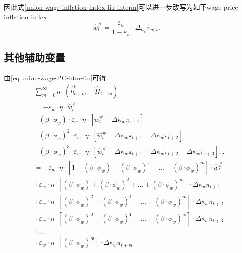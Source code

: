 因此式\eqref{union-wage-inflation-index-lin-interm}可以进一步改写为如下wage price inflation index
\begin{equation}
\label{union-wage-inflation-index-lin}
\hat{w}^{\#}_t = \frac{\varepsilon_w}{1-\varepsilon_w} \cdot \Delta_{\kappa_w} \hat{\pi}_{w,t}.
\end{equation}

\subsection{其他辅助变量}
\label{sec:union-wage-PC-wage-auxiliary-others}
由\eqref{eq:union-wage-PC-htm-lin}可得
\begin{equation*}
\begin{split}
&\sum_{m=0}^{\infty} \eta \cdot \left(\hat{h}_{t+m}^t - \hat{H}_{t+m}\right) \\
&=-\varepsilon_w \cdot \eta \cdot \hat{w}^{\#}_t \\
&-\left(\beta \cdot \phi_w \right) \cdot \varepsilon_w \cdot \eta \cdot \left[\hat{w}^{\#}_t - \Delta\kappa_w\pi_{t+1}\right] \\
&-\left(\beta \cdot \phi_w \right)^2 \cdot \varepsilon_w \cdot \eta \cdot \left[\hat{w}^{\#}_t - \Delta\kappa_w\pi_{t+1} - \Delta\kappa_w\pi_{t+2}\right] \\
&-\left(\beta \cdot \phi_w \right)^3 \cdot \varepsilon_w \cdot \eta \cdot \left[\hat{w}^{\#}_t - \Delta\kappa_w\pi_{t+1} - \Delta\kappa_w\pi_{t+2} - \Delta\kappa_w\pi_{t+3}\right] \ldots\\
&=-\varepsilon_w \cdot \eta \cdot \left[1 + \left(\beta \cdot \phi_w\right) + \left(\beta \cdot \phi_w\right)^2 + \ldots + \left(\beta \cdot \phi_w\right)^m\right] \cdot \hat{w}^{\#}_t \\
& +\varepsilon_w \cdot \eta \cdot \left[\left(\beta \cdot \phi_w\right) + \left(\beta \cdot \phi_w\right)^2 + \ldots + \left(\beta \cdot \phi_w\right)^m\right] \cdot \Delta\kappa_w\pi_{t+1} \\
& +\varepsilon_w \cdot \eta \cdot \left[\left(\beta \cdot \phi_w\right)^2 + \left(\beta \cdot \phi_w\right)^3 + \ldots + \left(\beta \cdot \phi_w\right)^m\right] \cdot \Delta\kappa_w\pi_{t+2} \\
& +\varepsilon_w \cdot \eta \cdot \left[\left(\beta \cdot \phi_w\right)^3 + \left(\beta \cdot \phi_w\right)^4 + \ldots + \left(\beta \cdot \phi_w\right)^m\right] \cdot \Delta\kappa_w\pi_{t+3} \\
& + \ldots \\
& + \varepsilon_w \cdot \eta \cdot \left[\left(\beta \cdot \phi_w\right)^m\right] \cdot \Delta\kappa_w\pi_{t+m} \\

\end{split}
\end{equation*}
